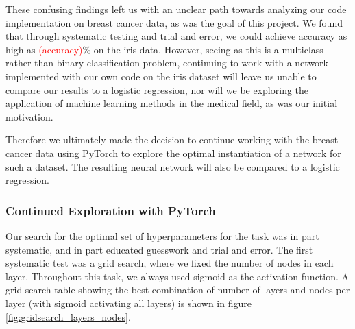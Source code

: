 These confusing findings left us with an unclear path towards analyzing our code implementation on breast cancer data, as was the goal of this project. We found that through systematic testing and trial and error, we could achieve accuracy as high as \textcolor{red}{(accuracy)}\% on the iris data. However, seeing as this is a multiclass rather than binary classification problem, continuing to work with a network implemented with our own code on the iris dataset will leave us unable to compare our results to a logistic regression, nor will we be exploring the application of machine learning methods in the medical field, as was our initial motivation.

Therefore we ultimately made the decision to continue working with the breast cancer data using PyTorch to explore the optimal instantiation of a network for such a dataset. The resulting neural network will also be compared to a logistic regression. 

\subsubsection{Continued Exploration with PyTorch}
Our search for the optimal set of hyperparameters for the task was in part systematic, and in part educated guesswork and trial and error. The first systematic test was a grid search, where we fixed the number of nodes in each layer. Throughout this task, we always used sigmoid as the activation function. A grid search table showing the best combination of number of layers and nodes per layer (with sigmoid activating all layers) is shown in figure \ref{fig:gridsearch_layers_nodes}. 


